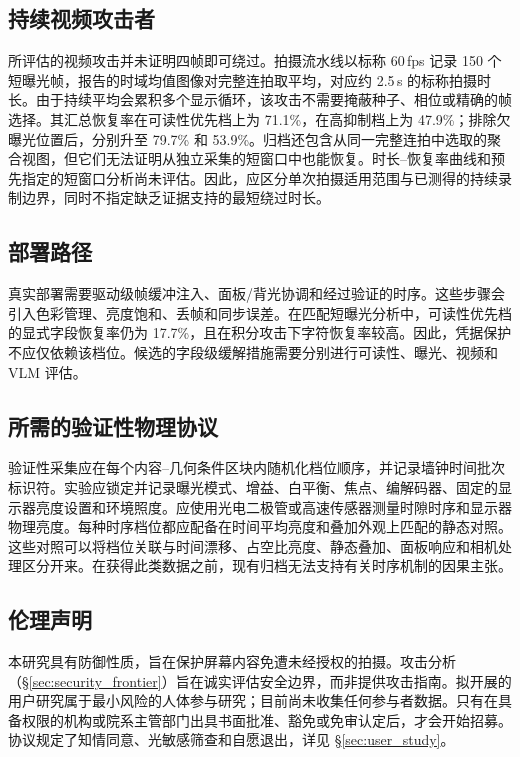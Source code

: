 \subsection{持续视频攻击者}

所评估的视频攻击并未证明四帧即可绕过。拍摄流水线以标称 60\,fps 记录 150 个短曝光帧，报告的时域均值图像对完整连拍取平均，对应约 2.5\,s 的标称拍摄时长。由于持续平均会累积多个显示循环，该攻击不需要掩蔽种子、相位或精确的帧选择。其汇总恢复率在可读性优先档上为 71.1\%，在高抑制档上为 47.9\%；排除欠曝光位置后，分别升至 79.7\% 和 53.9\%。归档还包含从同一完整连拍中选取的聚合视图，但它们无法证明从独立采集的短窗口中也能恢复。时长--恢复率曲线和预先指定的短窗口分析尚未评估。因此，应区分单次拍摄适用范围与已测得的持续录制边界，同时不指定缺乏证据支持的最短绕过时长。

\subsection{部署路径}

真实部署需要驱动级帧缓冲注入、面板/背光协调和经过验证的时序。这些步骤会引入色彩管理、亮度饱和、丢帧和同步误差。在匹配短曝光分析中，可读性优先档的显式字段恢复率仍为 17.7\%，且在积分攻击下字符恢复率较高。因此，凭据保护不应仅依赖该档位。候选的字段级缓解措施需要分别进行可读性、曝光、视频和 VLM 评估。

\subsection{所需的验证性物理协议}

验证性采集应在每个内容--几何条件区块内随机化档位顺序，并记录墙钟时间批次标识符。实验应锁定并记录曝光模式、增益、白平衡、焦点、编解码器、固定的显示器亮度设置和环境照度。应使用光电二极管或高速传感器测量时隙时序和显示器物理亮度。每种时序档位都应配备在时间平均亮度和叠加外观上匹配的静态对照。这些对照可以将档位关联与时间漂移、占空比亮度、静态叠加、面板响应和相机处理区分开来。在获得此类数据之前，现有归档无法支持有关时序机制的因果主张。

\subsection{伦理声明}

本研究具有防御性质，旨在保护屏幕内容免遭未经授权的拍摄。攻击分析（\S\ref{sec:security_frontier}）旨在诚实评估安全边界，而非提供攻击指南。拟开展的用户研究属于最小风险的人体参与研究；目前尚未收集任何参与者数据。只有在具备权限的机构或院系主管部门出具书面批准、豁免或免审认定后，才会开始招募。协议规定了知情同意、光敏感筛查和自愿退出，详见 \S\ref{sec:user_study}。

